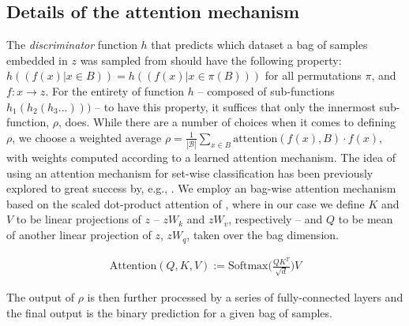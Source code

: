\subsection{Details of the attention mechanism}\label{ssec:attention-mechanism}
%
The \emph{discriminator} function $h$ that predicts which dataset a bag of samples embedded in $z$
was sampled from should have the following property: \( h((f(x) | x \in B)) = h((f(x) | x \in \pi
(B))) \) for all permutations $\pi$, and $f: x \to z$. 
%
For the entirety of function $h$ -- composed of sub-functions \( h_1(h_2(h_3...))) \) -- to have this
property, it suffices that only the innermost sub-function, $\rho$, does. 
%
While there are a number of choices when it comes to defining $\rho$, we choose a weighted average
$\rho = \frac{1}{|\mathcal{B}|} \sum_{x \in B}\mathrm{attention}(f(x), B) \cdot f(x)$, with weights
computed according to a learned attention mechanism. 
%
The idea of using an attention mechanism for set-wise classification has been previously explored
to great success by, e.g., \cite{lee2019set}. %
%
We employ an bag-wise attention mechanism based on the scaled dot-product attention of
\cite{vaswani2017attention}, where in our case we define $K$ and $V$ to be linear projections of
$z$ -- $zW_k$ and $zW_v$, respectively -- and $Q$ to be mean of another linear projection of $z$,
$zW_q$, taken over the bag dimension.

\begin{align*}
  \text{Attention}(\mathit{Q}, \mathit{K}, \mathit{V}) := \text{Softmax} \biggl( \frac{ \mathit{Q}
  \mathit{K}^T  } { \sqrt{d} } \biggr) V
\end{align*}

The output of $\rho$ is then further processed by a series of fully-connected layers and the final
output is the binary prediction for a given bag of samples.


